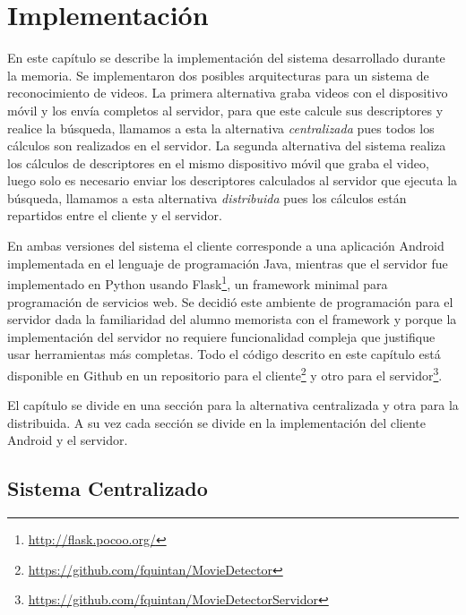 \chapter{Implementación}\label{implementacion}
En este capítulo se describe la implementación del sistema desarrollado durante la memoria. Se implementaron dos posibles arquitecturas para un sistema de reconocimiento de videos. La primera alternativa graba videos con el dispositivo móvil y los envía completos al servidor, para que este calcule sus descriptores y realice la búsqueda, llamamos a esta la alternativa \emph{centralizada} pues todos los cálculos son realizados en el servidor. La segunda alternativa del sistema realiza los cálculos de descriptores en el mismo dispositivo móvil que graba el video, luego solo es necesario enviar los descriptores calculados al servidor que ejecuta la búsqueda, llamamos a esta alternativa \emph{distribuida} pues los cálculos están repartidos entre el cliente y el servidor.

En ambas versiones del sistema el cliente corresponde a una aplicación Android implementada en el lenguaje de programación Java, mientras que el servidor fue implementado en Python usando Flask\footnote{\url{http://flask.pocoo.org/}}, un framework minimal para programación de servicios web. Se decidió este ambiente de programación para el servidor dada la familiaridad del alumno memorista con el framework y porque la implementación del servidor no requiere funcionalidad compleja que justifique usar herramientas más completas. Todo el código descrito en este capítulo está disponible en Github en un repositorio para el cliente\footnote{\url{https://github.com/fquintan/MovieDetector}} y otro para el servidor\footnote{\url{https://github.com/fquintan/MovieDetectorServidor}}.

El capítulo se divide en una sección para la alternativa centralizada y otra para la distribuida. A su vez cada sección se divide en la implementación del cliente Android y el servidor.


\section{Sistema Centralizado}\label{central}

